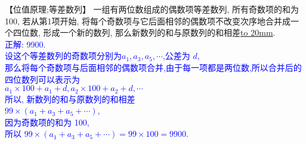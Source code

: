 \item {
    【位值原理;等差数列】
    一组有两位数组成的偶数项等差数列, 所有奇数项的和为100, 若从第1项开始, 将每个奇数项与它后面相邻的偶数项不改变次序地合并成一个四位数, 形成一个新的数列, 那么新数列的和与原数列的和相差\underline{\hbox to 20mm{}}.
    \ifshowSolution
        \\\fangsong{}\textcolor{blue}{
            正解: 9900.\\
            设这个等差数列的奇数项分别为$a_1,a_3,a_5,\cdots$,公差为 $d$,\\
            那么将每个奇数项与后面相邻的偶数项合并,由于每一项都是两位数,所以合并后的四位数列可以表示为\\
            $a_1\times 100 + a_1+d, a_2\times 100 + a_2 + d,\cdots$\\
            所以, 新数列的和与原数列的和相差\\
            $99\times (a_1+a_3+a_5+\cdots)$,\\
            因为奇数项的和为 100, \\
            所以 $99\times (a_1+a_3+a_5+\cdots) = 99\times 100 = 9900$.
        }
    \else
        \vspace{1cm}
    \fi
}
